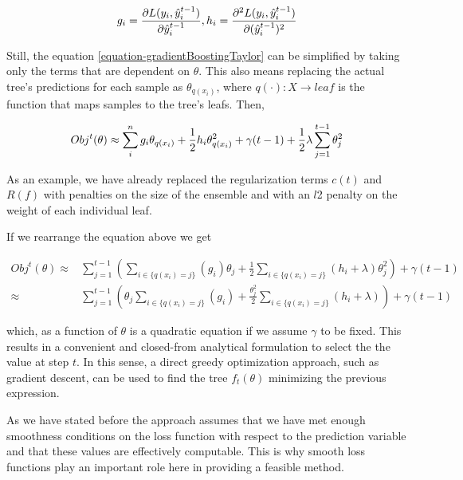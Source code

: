 \begin{equation}
g_i =  \frac{\partial L(y_i, \hat{y}^{t-1}_i)}{\partial \hat{y}^{t-1}_i}, \  \\
h_i =  \frac{\partial^2 L(y_i, \hat{y}^{t-1}_i)}{\partial (\hat{y}^{t-1}_i)^2 }
\end{equation}

Still, the equation \ref{equation-gradientBoostingTaylor} can be simplified by taking only the terms that are dependent on $\theta$. This also means replacing the actual tree's predictions for each sample as $\theta_{q(x_i)}$, where $q(\cdot): X \rightarrow leaf$ is the function that maps samples to the tree's leafs. Then,


\begin{equation} \label{eq:gb-objSteps1}
Obj^t(\theta) \approx  \sum_i^n {g_i \theta_{q(x_i)} + \frac{1}{2} h_i \theta_{q(x_i)}^2 } + \gamma ({t-1}) + \frac{1}{2}\lambda \sum_{j=1}^{t-1} \theta_j^2 \\
\end{equation}

As an example, we have already replaced the regularization terms $c(t)$ and $R(f)$ with penalties on the size of the ensemble and with an $l$2 penalty on the weight of each individual leaf.

If we rearrange the equation above we get

\begin{equation} \label{eq:gb-objSteps1}
\begin{split}
Obj^t(\theta) \approx  & \sum_{j=1}^{t-1} \left(  \sum_{i \in \{q(x_i)=j\}} (g_i )\theta_{j} + \frac{1}{2} \sum_{i \in \{q(x_i)=j\}} (h_i + \lambda ) \theta_{j}^2  \right) + \gamma ({t-1}) \\
\approx  & \sum_{j=1}^{t-1} \left(  \theta_{j}\sum_{i \in \{q(x_i)=j\}} (g_i ) + \frac{\theta_{j}^2}{2} \sum_{i \in \{q(x_i)=j\}} (h_i + \lambda )  \right) + \gamma ({t-1})
\end{split}
\end{equation}

which, as a function of $\theta$ is a quadratic equation if we assume $\gamma$ to be fixed. This results in a convenient and closed-from analytical formulation to select the the value at step $t$. In this sense, a direct greedy optimization approach, such as gradient descent, can be used to find the tree $f_t(\theta)$ minimizing the previous expression.

As we have stated before the approach assumes that we have met enough smoothness conditions on the loss function with respect to the prediction variable
and that these values are effectively computable. This is why smooth loss functions play an important role here in providing a feasible method.

